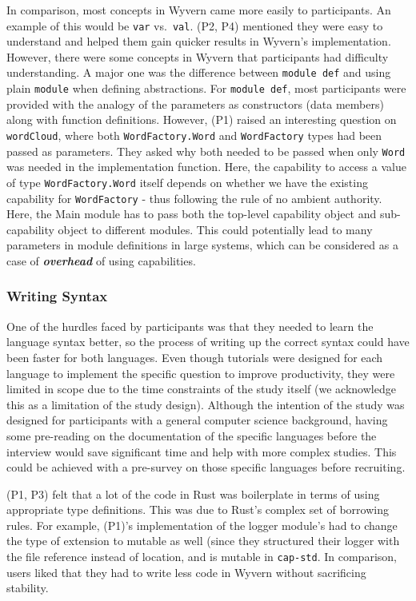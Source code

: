 In comparison, most concepts in Wyvern came more easily to participants. An example of this would be \texttt{var} vs.\ \texttt{val}. (P2, P4) mentioned they were easy to understand and helped them gain quicker results in Wyvern's implementation. However, there were some concepts in Wyvern that participants had difficulty understanding. A major one was the difference between \texttt{module def} and using plain \texttt{module} when defining abstractions. For \texttt{module def}, most participants were provided with the analogy of the parameters as constructors (data members) along with function definitions. However, (P1) raised an interesting question on \texttt{wordCloud}, where both \texttt{WordFactory.Word} and \texttt{WordFactory} types had been passed as parameters. They asked why both needed to be passed when only \texttt{Word} was needed in the implementation function. Here, the capability to access a value of type \texttt{WordFactory.Word} itself depends on whether we have the existing capability for \texttt{WordFactory} - thus following the rule of no ambient authority. Here, the Main module has to pass both the top-level capability object and sub-capability object to different modules. This could potentially lead to many parameters in module definitions in large systems, which can be considered as a case of \textit{\textbf{overhead}} of using capabilities.

\subsubsection{Writing Syntax} 
\noindent
One of the hurdles faced by participants was that they needed to learn the language syntax better, so the process of writing up the correct syntax could have been faster for both languages. Even though tutorials were designed for each language to implement the specific question to improve productivity, they were limited in scope due to the time constraints of the study itself (we acknowledge this as a limitation of the study design). Although the intention of the study was designed for participants with a general computer science background, having some pre-reading on the documentation of the specific languages before the interview would save significant time and help with more complex studies. This could be achieved with a pre-survey on those specific languages before recruiting.

(P1, P3) felt that a lot of the code in Rust was boilerplate in terms of using appropriate type definitions. This was due to Rust's complex set of borrowing rules. For example, (P1)'s implementation of the logger module's had to change the type of extension to mutable as well (since they structured their logger with the file reference instead of location, and  is mutable in \texttt{cap-std}. In comparison, users liked that they had to write less code in Wyvern without sacrificing stability. 


